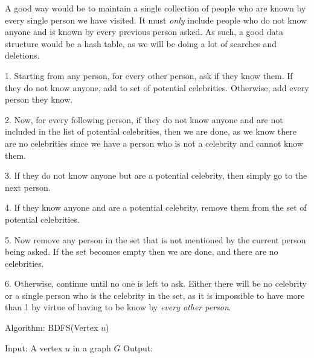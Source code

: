 \documentclass[11pt,letterpaper]{article}
\begin{document}
		A good way would be to maintain a single collection of people who are known by every single person we have visited. It must \textit{only} include people who do not know anyone and is known by every previous person asked.
		As such, a good data structure would be a hash table, as we will be doing a lot of searches and deletions.
		
		1. Starting from any person, for every other person, ask if they know them. If they do not know anyone, add to set of potential celebrities. Otherwise, add every person they know.
		
		2. Now, for every following person, if they do not know anyone and are not included in the list of potential celebrities, then we are done, as we know there are no celebrities since we have a person who is not a celebrity and cannot know them.
		
		3. If they do not know anyone but are a potential celebrity, then simply go to the next person.
		
		4. If they know anyone and are a potential celebrity, remove them from the set of potential celebrities.
		
		5. Now remove any person in the set that is not mentioned by the current person being asked. If the set becomes empty then we are done, and there are no celebrities.
		
		6. Otherwise, continue until no one is left to ask. Either there will be no celebrity or a single person who is the celebrity in the set, as it is impossible to have more than 1 by virtue of having to be know by \textit{every other person}.
		\begin{center}
			Algorithm: BDFS(Vertex $u$)
		\end{center}
		\begin{algorithm}[caption={}, label={alg1}]
			Input: A vertex $u$ in a graph $G$
			Output: 
			
			
		\end{algorithm}
	
	\section{}
	
		
	\section{}
		
	
	\section{}
		
	
\end{document}
